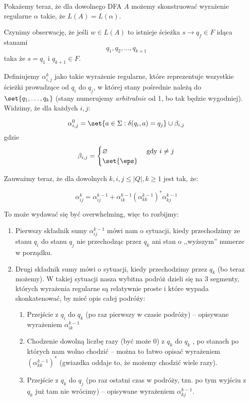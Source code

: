 Pokażemy teraz, że dla dowolnego DFA \(A\) możemy skonstruować wyrażenie regularne \(\alpha\) takie, że \( L(A) = L(\alpha)\).

Czynimy obserwację, że jeśli \( w \in L(A) \) to istnieje ścieżka \( s \rightarrow q_f \in F \) idąca stanami
\[
	q_1, q_2, \dots, q_{k+1}
\]
taka że \( s = q_1 \) i \( q_{k+1} \in F\).

Definiujemy \( \alpha_{i, j}^k \) jako takie wyrażenie regularne, które reprezentuje wszystkie ścieżki prowadzące od \( q_i \) do \( q_j \), w której stany pośrednie należą do \( \set{q_1, \dots, q_k} \) (stany numerujemy \textit{arbitralnie} od 1, bo tak będzie wygodniej). Widzimy, że dla każdych \(i, j\):

\[
	\alpha_{i, j}^0 = \set{a \in \Sigma : \delta(q_i, a) = q_j } \cup \beta_{i, j}
\]
gdzie
\[
	\beta_{i, j} = \begin{cases}
		\varnothing & \text{ gdy } i \neq j \\
		\set{\eps}
	\end{cases}
\]

Zauważmy teraz, że dla dowolnych \(k, i, j \leq |Q|, k \geq 1 \) jest tak, że:

\[
	\alpha^{k}_{ij} = \alpha^{k-1}_{ij} + \alpha^{k-1}_{ik} (\alpha^{k-1}_{kk})^* \alpha^{k-1}_{kj}
\]

To może wydawać się być overwhelming, więc to rozbijmy:

\begin{enumerate}
	\item Pierwszy składnik sumy \( \alpha^{k-1}_{ij} \) mówi nam o sytuacji, kiedy przechodzimy ze stanu \(q_i\) do stanu \(q_j\) nie przechodząc przez \(q_k\)  ani stan o ,,wyższym'' numerze w porządku.
	\item Drugi składnik sumy mówi o sytuacji, kiedy przechodzimy przez \(q_k\) (bo teraz możemy). W takiej sytuacji nasza wybitna podróż dzieli się na 3 segmenty, których wyrażenia regularne są relatywnie proste i które wypada skonkatenować, by mieć opis całej podróży:

	      \begin{enumerate}
		      \item Przejście z \(q_i\) do \(q_k\) (po raz pierwszy w czasie podróży) -- opisywane wyrażeniem \(\alpha^{k-1}_{ik}\)
		      \item Chodzenie dowolną liczbę razy (być może 0) z \(q_k\) do \(q_k\) , po stanach po których nam wolno chodzić -- można to łatwo opisać wyrażeniem \( (\alpha^{k-1}_{kk})^* \) (gwiazdka oddaje to, że możemy chodzić wiele razy).
		      \item Przejście z \(q_k\) do \(q_j\) (po raz ostatni czas w podróży, tzn. po tym wyjściu z \(q_k\) już tam nie wrócimy) -- opisywane wyrażeniem \( \alpha^{k-1}_{kj}  \).
	      \end{enumerate}
\end{enumerate}

